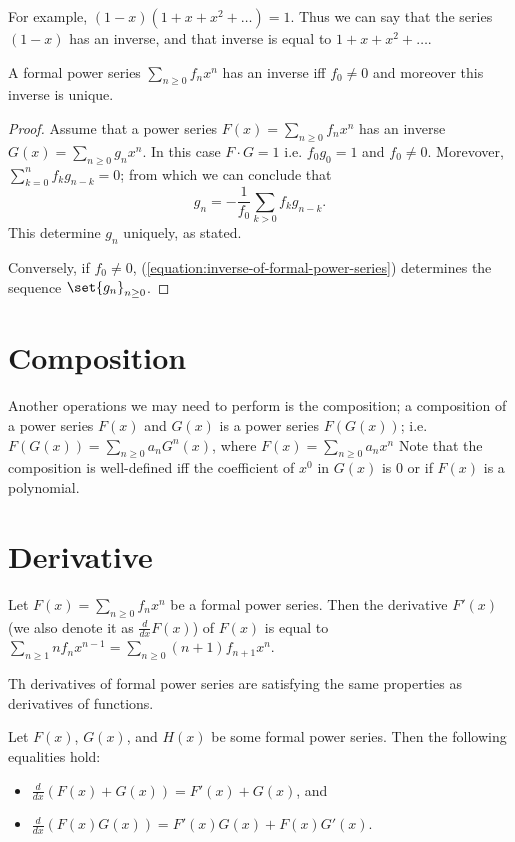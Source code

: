 For example, $(1 - x) (1 + x + x^2 + \dots) = 1$. Thus we can say that the
series $(1 - x)$ has an inverse, and that inverse is equal to $1 + x + x^2 +
\dots$.
\begin{theorem}
  A formal power series $\sum_{n \ge 0} f_n x^n$ has an inverse iff
  $f_0 \neq 0$ and moreover this inverse is unique.
\end{theorem}
\begin{proof}
  Assume that a power series $F(x) = \sum_{n \ge 0} f_n x^n$ has an inverse
  $G(x) = \sum_{n \ge 0} g_n x^n$. In this case $F \cdot G = 1$ i.e.
  $f_0 g_0 = 1$ and $f_0 \neq 0$. Morevover,
  $\sum_{k = 0}^n f_k g_{n - k} = 0$; from which we can conclude that
  \begin{equation}
    \label{equation:inverse-of-formal-power-series}
    g_n = -\frac{1}{f_0} \sum_{k > 0} f_k g_{n - k}.
  \end{equation}
  This determine $g_n$ uniquely, as stated.

  Conversely, if $f_0 \neq 0$, (\ref{equation:inverse-of-formal-power-series})
  determines the sequence $\set{g_n}_{n \ge 0}$.
\end{proof}

\section{Composition}
Another operations we may need to perform is the composition; a composition of
a power series $F(x)$ and $G(x)$ is a power series $F(G(x))$; i.e.
$F(G(x)) = \sum_{n \ge 0} a_n G^n(x)$, where $F(x) = \sum_{n \ge 0} a_n x^n$
Note that the composition is well-defined iff the coefficient of $x^0$ in $G(x)$
is $0$ or if $F(x)$ is a polynomial.

\section{Derivative}
Let $F(x) = \sum_{n \ge 0} f_n x^n$ be a formal power series. Then the
derivative $F'(x)$ (we also denote it as $\frac{d}{dx} F(x)$) of $F(x)$ is
equal to
$\sum_{n \ge 1} n f_n x^{n - 1} = \sum_{n \ge 0} (n + 1) f_{n + 1} x^n$.

Th derivatives of formal power series are satisfying the same properties as
derivatives of functions.
\begin{theorem}
  Let $F(x)$, $G(x)$, and $H(x)$ be some formal power series. Then the following
  equalities hold:
  \begin{itemize}
    \item $\frac{d}{dx}(F(x) + G(x)) = F'(x) + G(x)$, and
    \item $\frac{d}{dx}(F(x) G(x)) = F'(x)G(x) + F(x)G'(x)$.
  \end{itemize}
\end{theorem}

